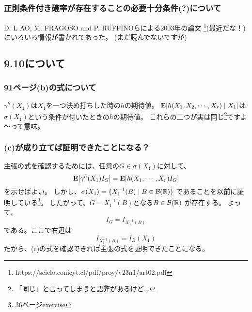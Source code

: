         \subsubsection{正則条件付き確率が存在することの必要十分条件(?)について}
          D. L
          AO, M. FRAGOSO and P. RUFFINOらによる2003年の論文
          \footnote{https://scielo.conicyt.cl/pdf/proy/v23n1/art02.pdf}(最近だな！)
          にいろいろ情報が書かれてあった。
          (まだ読んでないですが)

    \subsection{9.10について}
      \subsubsection{91ページ(b)の式について}
          $\gamma^{h}(X_1)$は$X_1$を一つ決め打ちした時の$h$の期待値。
          ${\mathbf{E}}[h(X_1,X_2, \cdots , X_r) \mid X_1]$は$\sigma(X_1)$という条件が付いたときの$h$の期待値。
          これらの二つが実は同じ\footnote{「同じ」と言ってしまうと語弊があるけど...}ですよ～って意味。

      \subsubsection{(c)が成り立てば証明できたことになる？}
          主張の式を確認するためには、任意の$G \in \sigma(X_1)$に対して、
          \[
            {\mathbf{E}}[\gamma^{h}(X_1)I_G] = {\mathbf{E}}[h(X_1, \cdots, X_r)I_G]
          \]
          を示せばよい。
          しかし、$\sigma(X_1) = \{X_{1}^{-1}(B) \mid B \in {\mathcal{B}}({\mathbb{R}})\}$
          であることを以前に証明している\footnote{36ページexercise}。
          したがって、$G = X_{1}^{-1}(B)$となる$B \in {\mathcal{B}}({\mathbb{R}})$
          が存在する。
          よって、
          \[
            I_G = I_{X_{1}^{-1}(B)}
          \]
          である。ここで右辺は
          \[
            I_{X_{1}^{-1}(B)} = I_B(X_1)
          \]
          だから、(c)の式を確認できれば主張の式を証明できたことになる。

